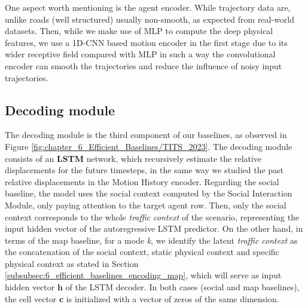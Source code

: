 One aspect worth mentioning is the agent encoder. While trajectory data are, unlike roads (well structured) usually non-smooth, as expected from real-world datasets. Then, while we make use of MLP to compute the deep physical features, we use a 1D-CNN based motion encoder in the first stage due to its wider receptive field compared with MLP in such a way the convolutional encoder can smooth the trajectories and reduce the influence of noisy input trajectories.

\subsection{Decoding module}
\label{subsubsec:6_efficient_baselines_decoding_modules}

The decoding module is the third component of our baselines, as observed in Figure \ref{fig:chapter_6_Efficient_Baselines/TITS_2023}. The decoding module consists of an \textbf{LSTM} network, which recursively estimate the relative displacements for the future timesteps, in the same way we studied the past relative displacements in the Motion History encoder. Regarding the social baseline, the model uses the social context computed by the Social Interaction Module, only paying attention to the target agent row. Then, only the social context corresponds to the whole \textit{traffic context} of the scenario, representing the input hidden vector of the autoregressive LSTM predictor. On the other hand, in terms of the map baseline, for a mode \textit{k}, we identify the latent \textit{traffic context} as the concatenation of the social context, static physical context and specific physical context as stated in Section \ref{subsubsec:6_efficient_baselines_encoding_map}, which will serve as input hidden vector $\mathbf{h}$ of the LSTM decoder. In both cases (social and map baselines), the cell vector $\mathbf{c}$ is initialized with a vector of zeros of the same dimension. 

